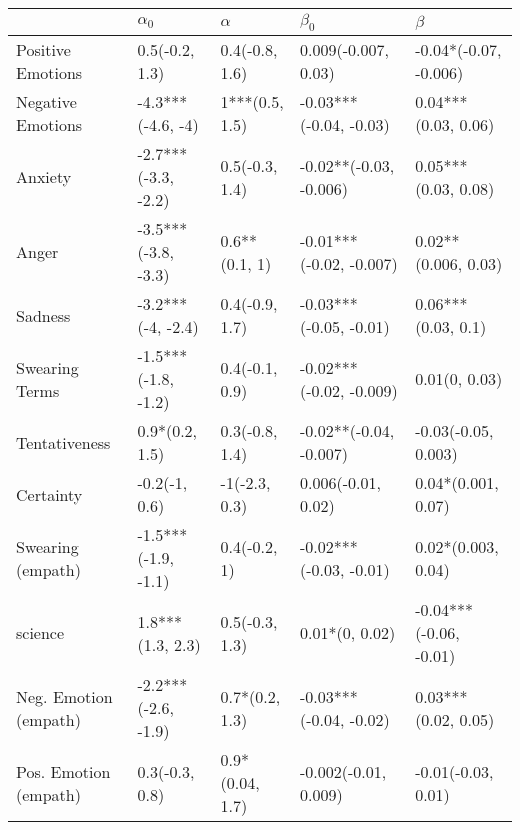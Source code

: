 \begin{tabular}{lllll}
\toprule
{} &           $\alpha_0$ &         $\alpha$ &                $\beta_0$ &                 $\beta$ \\
\midrule
Positive Emotions     &       0.5(-0.2, 1.3) &   0.4(-0.8, 1.6) &      0.009(-0.007, 0.03) &   -0.04*(-0.07, -0.006) \\
Negative Emotions     &    -4.3***(-4.6, -4) &   1***(0.5, 1.5) &   -0.03***(-0.04, -0.03) &     0.04***(0.03, 0.06) \\
Anxiety               &  -2.7***(-3.3, -2.2) &   0.5(-0.3, 1.4) &   -0.02**(-0.03, -0.006) &     0.05***(0.03, 0.08) \\
Anger                 &  -3.5***(-3.8, -3.3) &    0.6**(0.1, 1) &  -0.01***(-0.02, -0.007) &     0.02**(0.006, 0.03) \\
Sadness               &    -3.2***(-4, -2.4) &   0.4(-0.9, 1.7) &   -0.03***(-0.05, -0.01) &      0.06***(0.03, 0.1) \\
Swearing Terms        &  -1.5***(-1.8, -1.2) &   0.4(-0.1, 0.9) &  -0.02***(-0.02, -0.009) &           0.01(0, 0.03) \\
Tentativeness         &       0.9*(0.2, 1.5) &   0.3(-0.8, 1.4) &   -0.02**(-0.04, -0.007) &     -0.03(-0.05, 0.003) \\
Certainty             &        -0.2(-1, 0.6) &    -1(-2.3, 0.3) &       0.006(-0.01, 0.02) &      0.04*(0.001, 0.07) \\
Swearing (empath)     &  -1.5***(-1.9, -1.1) &     0.4(-0.2, 1) &   -0.02***(-0.03, -0.01) &      0.02*(0.003, 0.04) \\
science               &     1.8***(1.3, 2.3) &   0.5(-0.3, 1.3) &           0.01*(0, 0.02) &  -0.04***(-0.06, -0.01) \\
Neg. Emotion (empath) &  -2.2***(-2.6, -1.9) &   0.7*(0.2, 1.3) &   -0.03***(-0.04, -0.02) &     0.03***(0.02, 0.05) \\
Pos. Emotion (empath) &       0.3(-0.3, 0.8) &  0.9*(0.04, 1.7) &     -0.002(-0.01, 0.009) &      -0.01(-0.03, 0.01) \\
\bottomrule
\end{tabular}
